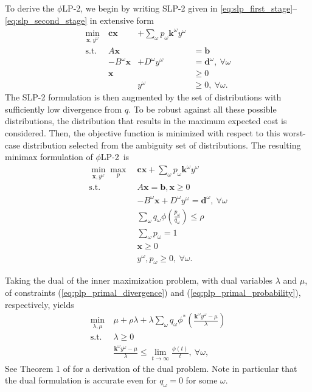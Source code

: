 \documentclass[ijoc,nonblindrev]{informs3} %
\newcommand{\x}{\mathbf{x}}
\renewcommand{\c}{\mathbf{c}}
\renewcommand{\k}{\mathbf{k}}
\renewcommand{\b}{\mathbf{b}}
\renewcommand{\d}{\mathbf{d}}
\newcommand{\st}{\mbox{s.t.}}
\newcommand{\plp}{$\phi$LP-2}
\begin{document}
To derive the \plp, we begin by writing SLP-2 given in \eqref{eq:slp_first_stage}--\eqref{eq:slp_second_stage} in extensive form
\[
	\begin{array}{rrrl}
		\min_{\x,y^\omega} \ & \c\x & + \sum_\omega p_\omega \k^\omega y^\omega \label{eq:slp2cost} \\
		\st \ & A\x & & = \b \nonumber \\
		& -B^\omega \x & + D^\omega y^\omega & = \d^\omega,\ \forall \omega \nonumber \\
		& \x & & \geq 0 \nonumber \\
		& & y^\omega & \geq 0,\ \forall \omega. \nonumber
	\end{array}
\]
The SLP-2 formulation is then augmented by the set of distributions with sufficiently low divergence from $q$.
To be robust against all these possible distributions, the distribution that results in the maximum expected cost is considered.
Then, the objective function is minimized with respect to this worst-case distribution selected from the ambiguity set of distributions.
The resulting minimax formulation of \plp\ is
\begin{align}
	\min_{\x,y^\omega} \max_p \ & \c\x + \sum_\omega p_\omega \k^\omega y^\omega \label{eq:plp_primal}\\
	\st \ & A\x = \b, \x \geq 0 \nonumber \\
	& -B^\omega \x + D^\omega y^\omega = \d^\omega,\ \forall \omega \nonumber \\
	& \sum_\omega q_\omega \phi\left(\frac{p_\omega}{q_\omega}\right) \leq \rho \label{eq:plp_primal_divergence} \\
	& \sum_\omega p_\omega = 1 \label{eq:plp_primal_probability} \\
	& \x \geq 0 \nonumber \\
	& y^\omega, p_\omega \geq 0,\ \forall \omega. \label{eq:nonneg}
\end{align}

Taking the dual of the inner maximization problem, with dual variables $\lambda$ and $\mu$, of constraints (\ref{eq:plp_primal_divergence}) and (\ref{eq:plp_primal_probability}), respectively, yields
\begin{align*}
	\min_{\lambda,\mu} \ & \mu + \rho \lambda + \lambda \sum_\omega q_\omega \phi^*\left(\frac{\k^\omega y^\omega - \mu}{\lambda}\right) \\
	\st \ & \lambda \geq 0 \\
	& \frac{\k^\omega y^\omega - \mu}{\lambda} \leq \lim_{t \rightarrow \infty} \frac{\phi(t)}{t}, \ \forall \omega,
\end{align*}
See Theorem 1 of \cite{bental2011robust} for a derivation of the dual problem.
Note in particular that the dual formulation is accurate even for $q_\omega = 0$ for some $\omega$.
\end{document}
